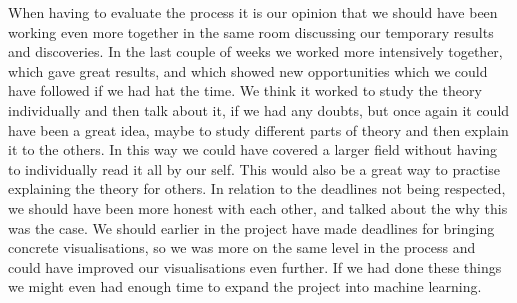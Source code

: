 \documentclass[Report.tex]{subfiles}
\begin{document}
When having to evaluate the process it is our opinion that we should have been working even more together in the same room discussing our temporary results and discoveries. In the last couple of weeks we worked more intensively together, which gave great results, and which showed new opportunities which we could have followed if we had hat the time. We think it worked to study the theory individually and then talk about it, if we had any doubts, but once again it could have been a great idea, maybe to study different parts of theory and then explain it to the others. In this way we could have covered a larger field without having to individually read it all by our self. This would also be a great way to practise explaining the theory for others. In relation to the deadlines not being respected, we should have been more honest with each other, and talked about the why this was the case. We should earlier in the project have made deadlines for bringing concrete visualisations, so we was more on the same level in the process and could have improved our visualisations even further. If we had done these things we might even had enough time to expand the project into machine learning.

\thispagestyle{empty}
\end{document}

